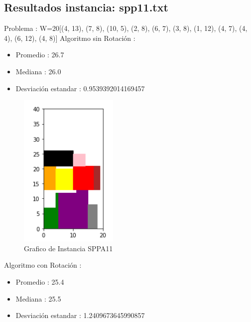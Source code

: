 \documentclass[10pt]{article}
\begin{document}
\subsection{Resultados instancia: spp11.txt}%
\label{subsec:Resultadosinstanciaspp11.txt}%
Problema : W=20{[}(4, 13), (7, 8), (10, 5), (2, 8), (6, 7), (3, 8), (1, 12), (4, 7), (4, 4), (6, 12), (4, 8){]} \newline%
%
 Algoritmo sin Rotación : %
\begin{itemize}%
\item%
Promedio : 26.7%
\item%
Mediana : 26.0%
\item%
Desviación estandar : 0.9539392014169457%
\end{itemize}


\begin{figure}[H]
\centerline{\includegraphics[width=0.5\linewidth]{4_sin_rotar.jpg}}
\caption{Grafico de Instancia SPPA11}
\label{fig_7}
\end{figure} 


%
Algoritmo con Rotación : %
\begin{itemize}%
\item%
Promedio : 25.4%
\item%
Mediana : 25.5%
\item%
Desviación estandar : 1.2409673645990857%
\end{itemize}%
\end{document}
